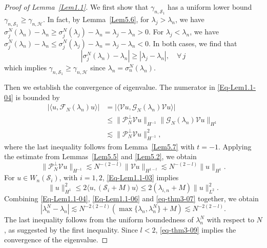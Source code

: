\documentclass[10pt,a4paper]{amsart}
\begin{document}
\begin{proof}[Proof of Lemma~\ref{Lem1.1}]
We first show that $\gamma_{n, \mathcal{S}_1}$ has a uniform lower bound $\gamma_{n, \mathcal{S}_1} \geq \gamma_{n, \mathcal{H}}$. In fact, by Lemma~\ref{Lem5.6},
for $\lambda_j > \lambda_n$, we have
$
\sigma_j^N(\lambda_n) - \lambda_n \geq \sigma_j^N(\lambda_j) - \lambda_n = \lambda_j - \lambda_n > 0.
$
For $\lambda_j < \lambda_n$, we have
$
\sigma_j^N(\lambda_n) - \lambda_n \leq \sigma_j^N(\lambda_j) - \lambda_n = \lambda_j - \lambda_n < 0.
$
In both cases, we find that
\[
|\sigma_j^N(\lambda_n) - \lambda_n| \geq |\lambda_j - \lambda_n|, \quad \forall\, j
\]
which implies $\gamma_{n, \mathcal{S}_1}\geq \gamma_{n,\mathcal{H}}$ since $\lambda_n=\sigma^N_n(\lambda_n)$. 

Then we establish the convergence of eigenvalue. The numerator in \eqref{Eq-Lem1.1-04} is bounded by
\begin{equation}\label{Eq-Lem1.1-06}
\begin{aligned}    
\bigl|\langle u, \mathcal{F}_N(\lambda_n) u \rangle\bigr|
&= \bigl|\langle \mathcal{V} u, \mathcal{G}_N(\lambda_n) \mathcal{V} u \rangle \bigr| \\
&\leq \|\mathcal{P}_N^\perp \mathcal{V} u\|_{H^{-1}} \|\mathcal{G}_N(\lambda_n) \mathcal{V} u\|_{H^{1}} \\
&\lesssim \|\mathcal{P}_N^\perp \mathcal{V} u\|_{H^{-1}}^2,
\end{aligned}
\end{equation}
where the last inequality follows from Lemma~\ref{Lem5.7} with $t = -1$.
Applying the estimate from Lemmas~\ref{Lem5.5} and \ref{Lem5.2}, we obtain
\begin{equation}\label{eq-thm3-07}
\|\mathcal{P}_N^\perp \mathcal{V} u\|_{H^{-1}} \lesssim N^{-(2-l)} \|\mathcal{V} u\|_{H^{1-l}} \lesssim N^{-(2-l)} \|u\|_{H^1}.
\end{equation}
For $u \in W_n(\mathcal{S}_i)$, with $i = 1,2$, \eqref{Eq-Lem1.1-03} implies
\begin{equation}\label{eq-thm3-08}
\|u\|_{H^1}^2 \leq 2\langle u, (\mathcal{S}_i + M) u \rangle \leq 2 (\lambda_{i,n} + M) \|u\|_{L^2}^2.
\end{equation}
Combining \eqref{Eq-Lem1.1-04}, \eqref{Eq-Lem1.1-06} and \eqref{eq-thm3-07} together, we obtain
\begin{equation}\label{eq-thm3-09}
|\lambda_n^N - \lambda_n| \lesssim N^{-2(2-l)} (\max\{\lambda_n, \lambda_n^N\} + M) \lesssim N^{-2(2-l)}.
\end{equation}
The last inequality follows from the uniform boundedness of $\lambda_n^N$ with respect to $N$, as suggested by the first inequality. Since $l < 2$, \eqref{eq-thm3-09} implies the convergence of the eigenvalue.


\end{proof}
\end{document}
